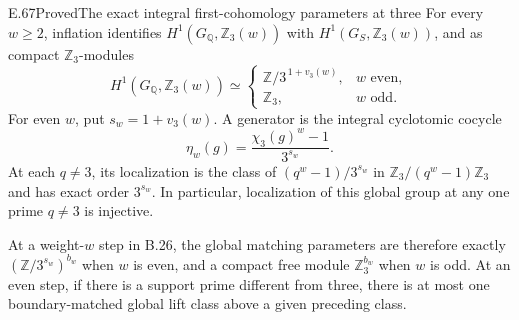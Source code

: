 \begin{result}{E.67}{Proved}{The exact integral first-cohomology parameters at three}
\label{coh:threeh1}
For every $w\geq2$, inflation identifies
$H^1(G_{\mathbb Q},\mathbb Z_3(w))$ with
$H^1(G_S,\mathbb Z_3(w))$, and as compact
$\mathbb Z_3$-modules
\[
 H^1(G_{\mathbb Q},\mathbb Z_3(w))\simeq
 \begin{cases}
   \mathbb Z/3^{\,1+v_3(w)},&w\text{ even},\\
   \mathbb Z_3,&w\text{ odd}.
 \end{cases}
\]
For even $w$, put $s_w=1+v_3(w)$. A generator is the
integral cyclotomic cocycle
\[
 \eta_w(g)=\frac{\chi_3(g)^w-1}{3^{s_w}}.
\]
At each $q\ne3$, its localization is the class of
$(q^w-1)/3^{s_w}$ in
$\mathbb Z_3/(q^w-1)\mathbb Z_3$ and has exact order
$3^{s_w}$. In particular, localization of this global
group at any one prime $q\ne3$ is injective.

At a weight-$w$ step in B.26, the global matching parameters
are therefore exactly
$(\mathbb Z/3^{s_w})^{b_w}$ when $w$ is even, and a compact
free module $\mathbb Z_3^{b_w}$ when $w$ is odd. At an even
step, if there is a support prime different from three,
there is at most one boundary-matched global lift class
above a given preceding class.
\end{result}

